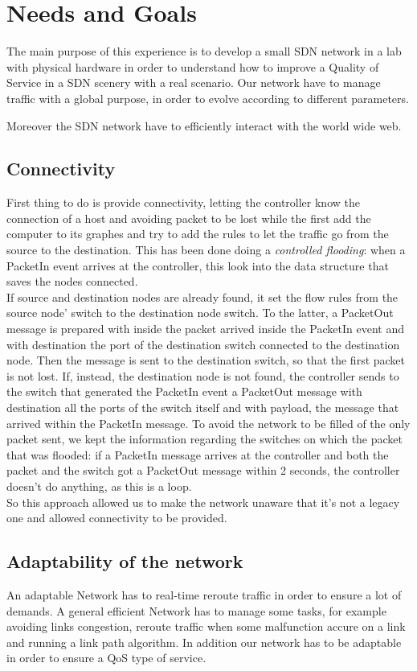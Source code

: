 \documentclass[article,10pt]{IEEEtran}
\begin{document}
\section{Needs and Goals}\label{sec:obb}
The main purpose of this experience is to develop a small SDN network in a lab with physical hardware
in order to understand how to improve a Quality of Service in a SDN scenery with a real scenario.
Our network have to manage traffic with a global purpose, in order to evolve according to different parameters.

Moreover the SDN network have to efficiently interact with the world wide web.

\subsection{Connectivity}\label{sec:connectivity}
First thing to do is provide connectivity, letting the controller know the connection of a host and avoiding packet to be lost while the first
add the computer to its graphes and try to add the rules to let the traffic go from the source to the destination. This has been done doing a
\textit{controlled flooding}: when a PacketIn event arrives at the controller, this look into the data structure that saves the nodes connected.
\\ If source and destination nodes are already found, it set the flow rules from the source node' switch to the destination node switch. To the latter,
a PacketOut message is prepared with inside the packet arrived inside the PacketIn event and with destination the port of the destination switch connected
to the destination node. Then the message is sent to the destination switch, so that the first packet is not lost.
If, instead, the destination node is not found, the controller sends to the switch that generated the PacketIn event a PacketOut message
with destination all the ports of the switch itself and with payload, the message that arrived within the PacketIn message.
To avoid the network to be filled of the only packet sent, we kept the information regarding the switches on which the packet that was flooded:
if a PacketIn message arrives at the controller and both the packet and the switch got a PacketOut message within 2 seconds, the controller doesn't
do anything, as this is a loop.
\\ So this approach allowed us to make the network unaware that it's not a legacy one and allowed connectivity to be provided.

\subsection{Adaptability of the network}
An adaptable Network has to real-time reroute traffic in order to ensure a lot of demands.
A general efficient Network has to manage some tasks, for example avoiding links congestion, reroute traffic when some malfunction accure on a link
and running a link path algorithm. 
In addition our network has to be adaptable in order to ensure a QoS type of service.
\end{document}
